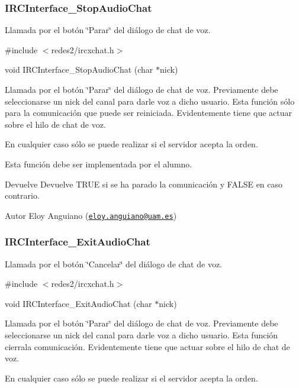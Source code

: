  \hypertarget{IRCInterface_StopAudioChat}{}\subsubsection{I\-R\-C\-Interface\-\_\-\-Stop\-Audio\-Chat}\label{IRCInterface_StopAudioChat}
Llamada por el botón \char`\"{}\-Parar\char`\"{} del diálogo de chat de voz.

\#include $<$redes2/ircxchat.\-h$>$

void I\-R\-C\-Interface\-\_\-\-Stop\-Audio\-Chat (char $\ast$nick)

Llamada por el botón \char`\"{}\-Parar\char`\"{} del diálogo de chat de voz. Previamente debe seleccionarse un nick del canal para darle voz a dicho usuario. Esta función sólo para la comunicación que puede ser reiniciada. Evidentemente tiene que actuar sobre el hilo de chat de voz.

En cualquier caso sólo se puede realizar si el servidor acepta la orden.

Esta función debe ser implementada por el alumno.

\begin{DoxyReturn}{Devuelve}
Devuelve T\-R\-U\-E si se ha parado la comunicación y F\-A\-L\-S\-E en caso contrario.
\end{DoxyReturn}
\begin{DoxyAuthor}{Autor}
Eloy Anguiano (\href{mailto:eloy.anguiano@uam.es}{\tt eloy.\-anguiano@uam.\-es})
\end{DoxyAuthor}


 \hypertarget{IRCInterface_ExitAudioChat}{}\subsubsection{I\-R\-C\-Interface\-\_\-\-Exit\-Audio\-Chat}\label{IRCInterface_ExitAudioChat}
Llamada por el botón \char`\"{}\-Cancelar\char`\"{} del diálogo de chat de voz.

\#include $<$redes2/ircxchat.\-h$>$

void I\-R\-C\-Interface\-\_\-\-Exit\-Audio\-Chat (char $\ast$nick)

Llamada por el botón \char`\"{}\-Parar\char`\"{} del diálogo de chat de voz. Previamente debe seleccionarse un nick del canal para darle voz a dicho usuario. Esta función cierrala comunicación. Evidentemente tiene que actuar sobre el hilo de chat de voz.

En cualquier caso sólo se puede realizar si el servidor acepta la orden.


